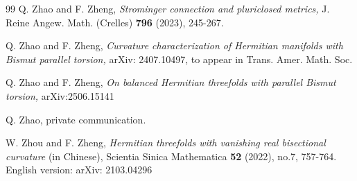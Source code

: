 \documentclass{amsart}
\begin{document}
\begin{thebibliography}{99}
 Q. Zhao and F. Zheng, \emph{Strominger connection and pluriclosed metrics,}  J. Reine Angew. Math. (Crelles) {\bf 796} (2023),
245-267.



 Q. Zhao and F. Zheng, \emph{Curvature characterization of Hermitian manifolds with Bismut parallel torsion,} arXiv: {2407.10497}, to appear in Trans. Amer. Math. Soc.

 Q. Zhao and F. Zheng, \emph{On balanced Hermitian threefolds with parallel Bismut torsion,} arXiv:2506.15141

 {Q. Zhao, private communication.}




  W. Zhou and F. Zheng, \emph{ Hermitian threefolds with vanishing real bisectional curvature} (in Chinese), Scientia Sinica Mathematica {\bf 52} (2022), no.7, 757-764. English version: arXiv: 2103.04296

\end{thebibliography}
\end{document}
